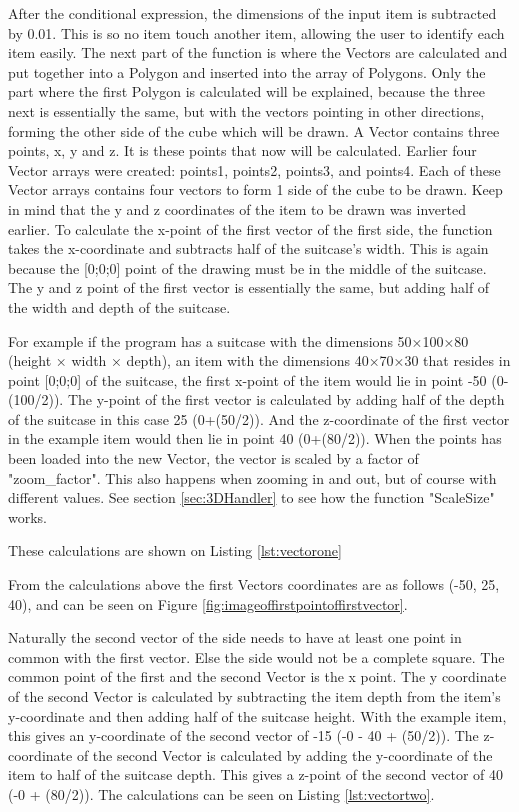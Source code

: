 After the conditional expression, the dimensions of the input item is subtracted by 0.01. This is so no item touch another item, allowing the user to identify each item easily. 
The next part of the function is where the Vectors are calculated and put together into a Polygon and inserted into the array of Polygons. Only the part where the first Polygon is calculated will be explained, because the three next is essentially the same, but with the vectors pointing in other directions, forming the other side of the cube which will be drawn.
A Vector contains three points, x, y and z. It is these points that now will be calculated. Earlier four Vector arrays were created: points1, points2, points3, and points4. Each of these Vector arrays contains four vectors to form 1 side of the cube to be drawn. 
Keep in mind that the y and z coordinates of the item to be drawn was inverted earlier. 
To calculate the x-point of the first vector of the first side, the function takes the x-coordinate and subtracts half of the suitcase's width. This is again because the [0;0;0] point of the drawing must be in the middle of the suitcase. The y and z point of the first vector is essentially the same, but adding half of the width and depth of the suitcase.

For example if the program has a suitcase with the dimensions 50×100×80 (height × width × depth), an item with the dimensions 40×70×30 that resides in point [0;0;0] of the suitcase, the first x-point of the item would lie in point -50 (0-(100/2)). 
The y-point of the first vector is calculated by adding half of the depth of the suitcase in this case 25 (0+(50/2)). And the z-coordinate of the first vector in the example item would then lie in point 40 (0+(80/2)).
When the points has been loaded into the new Vector, the vector is scaled by a factor of "zoom\_factor". This also happens when zooming in and out, but of course with different values. See section \ref{sec:3DHandler} to see how the function "ScaleSize" works. 

These calculations are shown on Listing \ref{lst:vectorone}


From the calculations above the first Vectors coordinates are as follows (-50, 25, 40), and can be seen on Figure  \ref{fig:imageoffirstpointoffirstvector}.

Naturally the second vector of the side needs to have at least one point in common with the first vector. Else the side would not be a complete square. 
The common point of the first and the second Vector is the x point. 
The y coordinate of the second Vector is calculated by subtracting the item depth from the item's y-coordinate and then adding half of the suitcase height. With the example item, this gives an y-coordinate of the second vector of -15 (-0 - 40 + (50/2)).
The z-coordinate of the second Vector is calculated by adding the y-coordinate of the item to half of the suitcase depth. This gives a z-point of the second vector of 40 (-0 + (80/2)). The calculations can be seen on Listing \ref{lst:vectortwo}.


